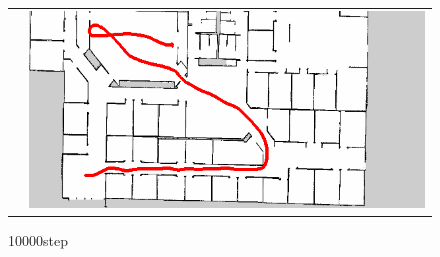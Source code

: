 \begin{figure}[h]
\begin{tabular}{cc}
\begin{minipage}[h]{0.45\hsize}
    \end{minipage} &
    \begin{minipage}[h]{0.45\hsize}
      \centering
      \includegraphics[keepaspectratio, scale=0.3]{images/exp1.2_10000_9.png}
    \end{minipage} \\
  \end{tabular}
   \caption*{10000step}
\end{figure}

